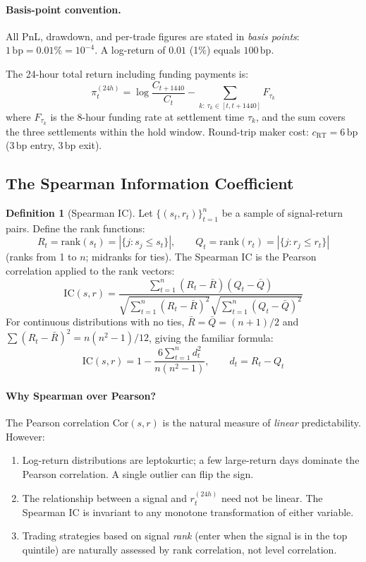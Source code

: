 \documentclass[12pt, a4paper]{article}
\theoremstyle{plain}
\theoremstyle{definition}
\newtheorem{definition}{Definition}[section]
\newcommand{\IC}{\mathrm{IC}}
\newcommand{\Cor}{\mathrm{Cor}}
\newcommand{\rank}{\mathrm{rank}}
\newcommand{\bp}{\,\mathrm{bp}}
\begin{document}
\paragraph{Basis-point convention.}
All PnL, drawdown, and per-trade figures are stated in \emph{basis points}:
$1\bp = 0.01\% = 10^{-4}$.  A log-return of $0.01$ (1\%) equals $100\bp$.

The 24-hour total return including funding payments is:
\begin{equation}
  \pi_t^{(24h)} = \log\frac{C_{t+1440}}{C_t}
                  - \sum_{k:\,\tau_k \in [t, t+1440]} F_{\tau_k}
\end{equation}
where $F_{\tau_k}$ is the 8-hour funding rate at settlement time $\tau_k$,
and the sum covers the three settlements within the hold window.
Round-trip maker cost: $c_{\mathrm{RT}} = 6\bp$ ($3\bp$ entry, $3\bp$ exit).

\subsection{The Spearman Information Coefficient}
\label{sec:IC}

\begin{definition}[Spearman IC]
  Let $\{(s_t, r_t)\}_{t=1}^n$ be a sample of signal-return pairs.
  Define the rank functions:
  \[
    R_t = \rank(s_t) = \left|\{j : s_j \leq s_t\}\right|, \qquad
    Q_t = \rank(r_t) = \left|\{j : r_j \leq r_t\}\right|
  \]
  (ranks from 1 to $n$; midranks for ties).  The Spearman IC is the Pearson
  correlation applied to the rank vectors:
  \begin{equation}
    \IC(s, r) = \frac{\sum_{t=1}^n (R_t - \bar{R})(Q_t - \bar{Q})}
                     {\sqrt{\sum_{t=1}^n (R_t - \bar{R})^2}
                      \sqrt{\sum_{t=1}^n (Q_t - \bar{Q})^2}}
    \label{eq:spearman}
  \end{equation}
  For continuous distributions with no ties, $\bar{R} = \bar{Q} = (n+1)/2$
  and $\sum (R_t - \bar{R})^2 = n(n^2-1)/12$, giving the familiar formula:
  \[
    \IC(s, r) = 1 - \frac{6\sum_{t=1}^n d_t^2}{n(n^2 - 1)},
    \qquad d_t = R_t - Q_t
  \]
\end{definition}

\paragraph{Why Spearman over Pearson?}
The Pearson correlation $\Cor(s, r)$ is the natural measure of
\emph{linear} predictability.  However:
\begin{enumerate}[noitemsep]
  \item Log-return distributions are leptokurtic; a few large-return days
        dominate the Pearson correlation.  A single outlier can flip the sign.
  \item The relationship between a signal and $r_t^{(24h)}$ need not be
        linear.  The Spearman IC is invariant to any monotone transformation
        of either variable.
  \item Trading strategies based on signal \emph{rank} (enter when the signal
        is in the top quintile) are naturally assessed by rank correlation,
        not level correlation.
\end{enumerate}
\end{document}
